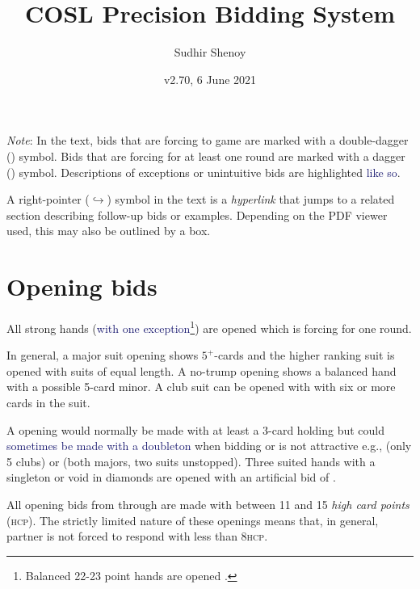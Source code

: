 \documentclass[a4paper,article,oneside]{memoir}
\newcommand{\gap}{\vspace{\baselineskip}}
\newcommand{\hcp}{\textsc{hcp}}
\newcommand{\orf}[1]{#1\textcolor{ForestGreen}{\dag}} %
\newcommand{\gf}[1]{#1\textcolor{Orange}{\ddag}} %
\newcommand{\excp}[1]{\textcolor{MidnightBlue}{#1}} %
\newcommand{\hyp}[1]{\hyperlink{#1}{$\hookrightarrow$}} %
\begin{document}
\title{COSL Precision Bidding System}
\author{Sudhir Shenoy}
\date{v2.70, 6 June 2021}
\maketitle

\tableofcontents

\gap\gap

\emph{Note}: In the text, bids that are forcing to game are marked
with a double-dagger (\gf{}) symbol. Bids that are forcing for at
least one round are marked with a dagger (\orf{}) symbol. Descriptions
of exceptions or unintuitive bids are highlighted \excp{like so}.

A right-pointer (\hyp{}) symbol in the text is a \emph{hyperlink} that
jumps to a related section describing follow-up bids or
examples. Depending on the PDF viewer used, this may also be outlined
by a box.

\pagebreak

\section{Opening bids}

All strong hands (\excp{with one exception\footnote{Balanced 22-23
    point hands are opened \Nt{2}.}}) are opened \orf{} which is
forcing for one round.

In general, a major suit opening shows $5^+$-cards and the higher
ranking suit is opened with suits of equal length. A no-trump opening
shows a balanced hand with a possible 5-card minor. A club suit can be
opened with  with six or more cards in the suit.

A  opening would normally be made with at least a 3-card holding
but could \excp{sometimes be made with a doubleton} when bidding
 or  is not attractive e.g., 
(only 5 clubs) or  (both majors, two suits
unstopped). Three suited hands with a singleton or void in diamonds
are opened with an artificial bid of .

All opening bids from  through  are made with between 11
and 15 \emph{high card points} (\hcp). The strictly limited nature of
these openings means that, in general, partner is not forced to
respond with less than 8\hcp.
\end{document}
